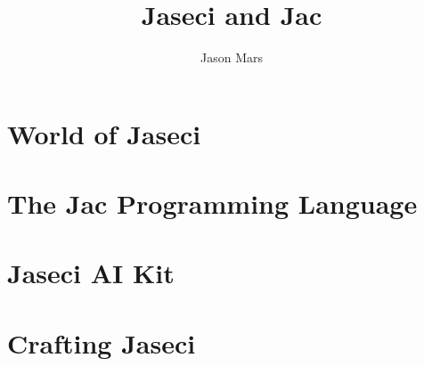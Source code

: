 \documentclass[oneside]{book}
\title{Jaseci and Jac}
\author{Jason Mars}
\begin{document}

\normalem








\part{World of Jaseci}
\label{part:jsword}








\part{The Jac Programming Language}
\label{part:jacd}










\part{Jaseci AI Kit}

\part{Crafting Jaseci}
\label{part:crafting}






\appendix








\end{document}
